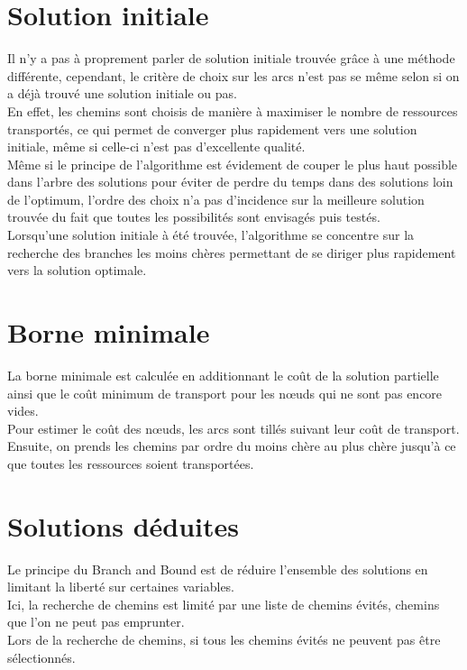 \documentclass[a4paper, 12pt]{report}
\begin{document}
\section{Solution initiale}
Il n'y a pas à proprement parler de solution initiale trouvée grâce à une méthode différente, 
cependant, le critère de choix sur les arcs n'est pas se même selon si on a déjà trouvé une solution initiale ou pas.\\
En effet, les chemins sont choisis de manière à maximiser le nombre de ressources transportés, 
ce qui permet de converger plus rapidement vers une solution initiale, même si celle-ci n'est pas d'excellente qualité.\\
Même si le principe de l'algorithme est évidement de couper le plus haut possible dans l'arbre des solutions 
pour éviter de perdre du temps dans des solutions loin de l'optimum, 
l'ordre des choix n'a pas d'incidence sur la meilleure solution trouvée 
du fait que toutes les possibilités sont envisagés puis testés.\\
Lorsqu'une solution initiale à été trouvée, l'algorithme se concentre sur la recherche des branches les moins chères
permettant de se diriger plus rapidement vers la solution optimale.

\section{Borne minimale}
La borne minimale est calculée en additionnant le coût de la solution partielle 
ainsi que le coût minimum de transport pour les nœuds qui ne sont pas encore vides. \\
Pour estimer le coût des nœuds, les arcs sont tillés suivant leur coût de transport. 
Ensuite, on prends les chemins par ordre du moins chère au plus chère
jusqu'à ce que toutes les ressources soient transportées. 

\section{Solutions déduites}
Le principe du Branch and Bound est de réduire l'ensemble des solutions en limitant la liberté sur certaines variables. \\
Ici, la recherche de chemins est limité par une liste de chemins évités, chemins que l'on ne peut pas emprunter.\\
Lors de la recherche de chemins, si tous les chemins évités ne  peuvent pas être sélectionnés. 
\end{document}
